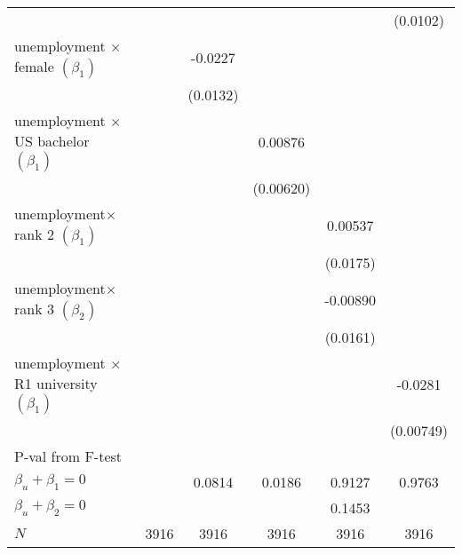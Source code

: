 \begin{table}[ht]
{\begin{tabular}{l*{5}{c}}
&                     &                     &                     &                     &    (0.0102)         \\
[1em]
unemployment $\times$ female  $\left( \beta_1 \right)$&                     &     -0.0227         &                     &                     &                     \\
            &                     &    (0.0132)         &                     &                     &                     \\
[1em]
unemployment $\times$ US bachelor  $\left( \beta_1 \right)$&                     &                     &     0.00876         &                     &                     \\
            &                     &                     &   (0.00620)         &                     &                     \\
[1em]
unemployment$\times$ rank 2  $\left( \beta_1 \right)$&                     &                     &                     &     0.00537         &                     \\
            &                     &                     &                     &    (0.0175)         &                     \\
[1em]
unemployment$\times$ rank 3  $\left( \beta_2 \right)$&                     &                     &                     &    -0.00890         &                     \\
            &                     &                     &                     &    (0.0161)         &                     \\
[1em]
unemployment $\times$ R1 university  $\left( \beta_1 \right)$&                     &                     &                     &                     &     -0.0281\sym{***}\\
            &                     &                     &                     &                     &   (0.00749)         \\
\hline
P-val from F-test &\\
$\beta_u + \beta_1 = 0 $      &                 &        0.0814         &      0.0186         &   0.9127       &        0.9763         \\
$\beta_u + \beta_2 = 0 $       &                 &                &                 &               0.1453     &              \\
\hline
\(N\)       &        3916         &        3916         &        3916         &        3916         &        3916         \\

\end{tabular}}
\end{table}
